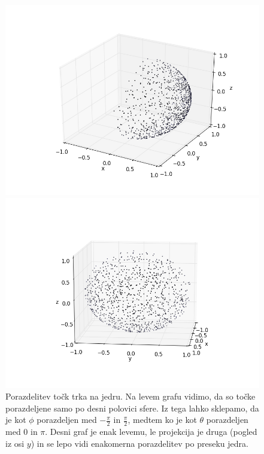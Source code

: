 \documentclass[slovene,11pt,a4paper]{article}
\numberwithin{equation}{section} %
\numberwithin{figure}{section} %
\numberwithin{table}{section} %
\begin{document}
\begin{figure}[!htb]
\centering
\begin{minipage}{0.5\textwidth}
\centering
\includegraphics[scale=0.45]{slike/porazdelitev_tock_trka_na_jedru.png}
\end{minipage}\hfill
\begin{minipage}{0.5\textwidth}
\centering
\includegraphics[scale=0.45]{slike/porazdelitev_tock_trka_na_jedru_1.png}
\end{minipage}

\caption{Porazdelitev točk trka na jedru. Na levem grafu vidimo, da so točke porazdeljene samo po desni polovici sfere. Iz tega lahko sklepamo, da je kot $\phi$ porazdeljen med $- \frac{\pi}{2}$ in $\frac{\pi}{2}$, medtem ko je kot $\theta$ porazdeljen med $0$ in $\pi$. Desni graf je enak levemu, le projekcija je druga (pogled iz osi $y$) in se lepo vidi enakomerna porazdelitev po preseku jedra.}
\end{figure}
\end{document}
